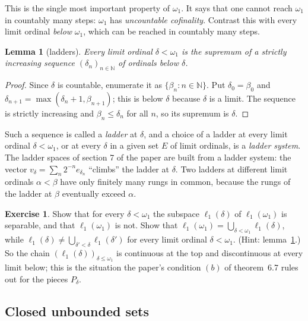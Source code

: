 \documentclass[12pt]{article}
\newtheorem{lemma}[theorem]{Lemma}
\theoremstyle{definition}
\newtheorem{exercise}[theorem]{Exercise}
\theoremstyle{remark}
\newcommand{\ellone}[1]{\ell_1(#1)}
\newcommand{\NN}{\mathbb{N}}
\begin{document}
This is the single most important property of $\omega_1$. It says that one
cannot reach $\omega_1$ in countably many steps: $\omega_1$ has
\emph{uncountable cofinality}. Contrast this with every limit ordinal
\emph{below} $\omega_1$, which can be reached in countably many steps.

\begin{lemma}[ladders]\label{Ladders} Every limit ordinal $\delta<\omega_1$ is
    the supremum of a strictly increasing sequence ${(\delta_n)}_{n\in\NN}$ of
    ordinals below $\delta$.
\end{lemma}
\begin{proof} Since $\delta$ is countable, enumerate it as $\{\beta_n:n\in\NN\}$.
    Put $\delta_0=\beta_0$ and $\delta_{n+1}=\max(\delta_n+1,\beta_{n+1})$;
    this is below $\delta$ because $\delta$ is a limit. The sequence is
    strictly increasing and $\beta_n\leq\delta_n$ for all $n$, so its
    supremum is $\delta$.
\end{proof}

Such a sequence is called a \emph{ladder} at $\delta$, and a choice of a
ladder at every limit ordinal $\delta<\omega_1$, or at every $\delta$ in a
given set $E$ of limit ordinals, is a \emph{ladder system}. The ladder spaces
of section 7 of the paper are built from a ladder system: the vector
$v_\delta=\sum_n 2^{-n}e_{\delta_n}$ ``climbs'' the ladder at $\delta$.
Two ladders at different limit ordinals $\alpha<\beta$ have only finitely
many rungs in common, because the rungs of the ladder at $\beta$ eventually
exceed $\alpha$.

\begin{exercise} Show that for every $\delta<\omega_1$ the subspace
    $\ellone{\delta}$ of $\ellone{\omega_1}$ is separable, and that
    $\ellone{\omega_1}$ is not. Show that
    $\ellone{\omega_1}=\bigcup_{\delta<\omega_1}\ellone{\delta}$, while
    $\ellone{\delta}\neq\bigcup_{\delta'<\delta}\ellone{\delta'}$ for every
    limit ordinal $\delta<\omega_1$. (Hint: lemma~\ref{Ladders}.) So the chain
    ${(\ellone{\delta})}_{\delta\leq\omega_1}$ is continuous at the top and
    discontinuous at every limit below; this is the situation the paper's
    condition $(b)$ of theorem~6.7 rules out for the pieces $P_\delta$.
\end{exercise}

\subsection{Closed unbounded sets}
\end{document}
